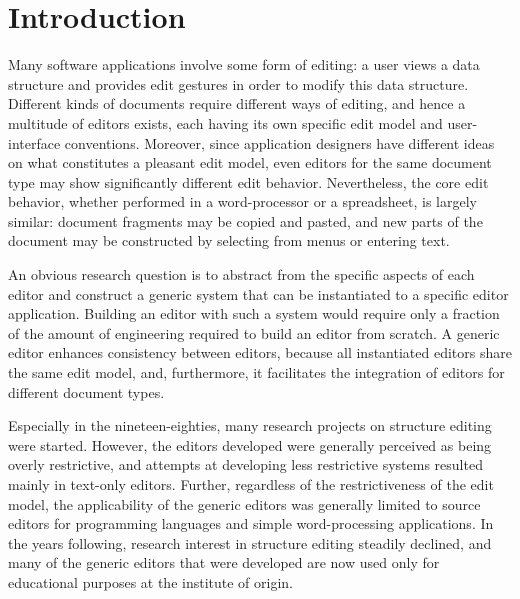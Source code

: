 \chapter{Introduction} \label{chap:introduction}




Many software applications involve some form of editing: a user views a data structure and provides edit gestures in order to modify this data structure. Different kinds of documents require different ways of editing, and hence a multitude of editors exists, each having its own specific edit model and user-interface conventions. Moreover,  since application designers have different ideas on what constitutes a pleasant edit model, even editors for the same document type may show significantly different edit behavior. Nevertheless, the core edit behavior, whether performed in a word-processor or a spreadsheet, is largely similar: document fragments may be copied and pasted, and new parts of the document may be constructed by selecting from menus or entering text. 


An obvious research question is to abstract from the specific aspects of each editor and construct a generic system that can be instantiated to a specific editor application. Building an editor with such a system would require only a fraction of the amount of engineering required to build an editor from scratch. 
A generic editor enhances consistency between editors, because all instantiated editors share the same edit model, and, furthermore, it facilitates the integration of editors for different document types.




Especially in the nineteen-eighties, many research projects on structure editing were started. However, the editors developed were generally perceived as being overly restrictive, and attempts at developing less restrictive systems resulted mainly in text-only editors. Further, regardless of the restrictiveness of the edit model, the applicability of the generic editors was generally limited to source editors for programming languages and simple word-processing applications.
In the years following, research interest in structure editing steadily declined, and many of the generic editors that were developed are now used only for educational purposes at the institute of origin.

